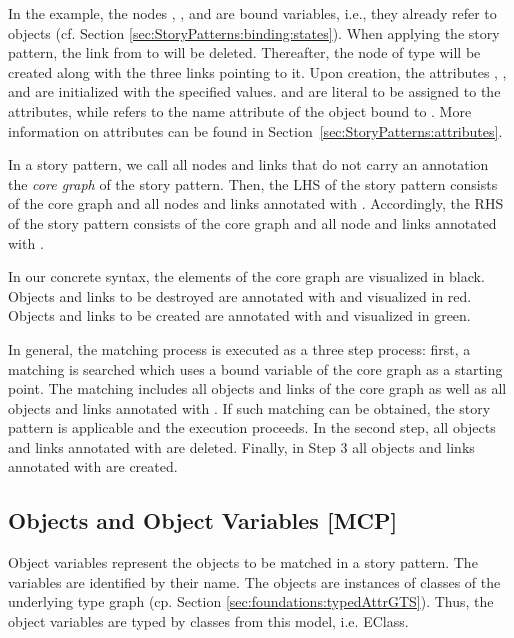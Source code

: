 In the example, the nodes , , and  are bound variables, i.e., they already refer to objects (cf. Section \ref{sec:StoryPatterns:binding:states}). When applying the story pattern, the link from  to  will be deleted. Thereafter, the node  of type  will be created along with the three links pointing to it. Upon creation, the attributes , , and  are initialized with the specified values.  and  are literal to be assigned to the attributes, while  refers to the name attribute of the object bound to . More information on attributes can be found in Section~\ref{sec:StoryPatterns:attributes}.

In a story pattern, we call all nodes and links that do not carry an annotation the \emph{core graph} of the story pattern. Then, the LHS of the story pattern consists of the core graph and all nodes and links annotated with \destroy. Accordingly, the RHS of the story pattern consists of the core graph and all node and links annotated with \create.

In our concrete syntax, the elements of the core graph are visualized in black. Objects and links to be destroyed are annotated with \destroy and visualized in red. Objects and links to be created are annotated with \create and visualized in green.

In general, the matching process is executed as a three step process:
first, a matching is searched which uses a bound variable of the core graph as a starting point. The matching includes all objects and links of the core graph as well as all objects and links annotated with \destroy. If such matching can be obtained, the story pattern is applicable and the execution proceeds. In the second step, all objects and links annotated with \destroy are deleted. Finally, in Step 3 all objects and links annotated with \create are created.

\subsection{Objects and Object Variables [MCP]}
\label{sec:StoryPatterns:objects}

Object variables represent the objects to be matched in a story pattern.
The variables are identified by their name.
The objects are instances of classes of the underlying type graph (cp.
Section \ref{sec:foundations:typedAttrGTS}). Thus, the object variables are typed by classes from this model, i.e.
EClass.

